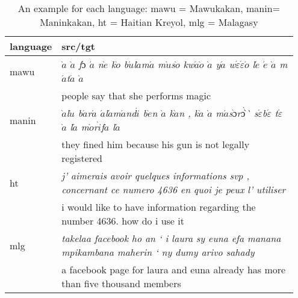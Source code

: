 
\begin{table*}
	\setlength{\tabcolsep}{4.5pt}
	\small
	\begin{tabular}{p{0.1\linewidth}p{0.85\linewidth}}
	\toprule
	language & src/tgt \\
	\toprule
	mawu & \emph{$\grave{a}$ $\grave{a}$ f$\acute{ɔ}$ $\acute{a}$ n$\grave{e}$ k$\grave{o}$ b$\acute{u}$l$\grave{a}$m$\acute{a}$ m$\grave{u}$s$\grave{o}$ kw$\acute{a}$$\grave{o}$ $\grave{a}$ y$\acute{a}$ w$\acute{\varepsilon}$$\acute{\varepsilon}$$\acute{o}$ l$\acute{e}$ $\acute{e}$ $\grave{a}$ m$\acute{a}$t$\acute{a}$
	$\grave{a}$} \\
	 & people say that she performs magic\\
	\midrule
	manin & \emph{$\grave{a}$l$\grave{u}$  b$\acute{a}$r$\acute{a}$ $\acute{a}$l$\acute{a}$m$\acute{a}$nd$\acute{i}$ b$\grave{e}$n $\grave{a}$ k$\grave{a}$n , k$\grave{a}$ $\grave{a}$ m$\acute{a}$s$\grave{ɔ}$r$\grave{ɔ̀}$̀  s$\acute{\varepsilon}$b$\acute{\varepsilon}$ t$\acute{\varepsilon}$ $\grave{a}$ l$\acute{a}$ 
	m$\grave{o}$r$\grave{i}$f$\grave{a}$ l$\acute{a}$} \\

	  & they fined him because his gun is not legally registered\\
	\midrule
	ht & \emph{j' aimerais avoir quelques informations svp , concernant ce numero 4636 en quoi je peux l' utiliser} \\
	&	 i would like to have information regarding the number 4636. how do i use it\\
	\midrule
	mlg & \emph{takelaa facebook ho an ` i laura sy euna efa manana mpikambana maherin  ` ny dumy arivo sahady} \\
	 & a facebook page for laura and euna already has more than five thousand members\\
	\bottomrule
	\end{tabular}
	\caption{An example for each language: mawu = Mawukakan, manin= Maninkakan, ht = Haitian Kreyol, mlg = Malagasy}
	\label{table:example_each}
\end{table*}
		
